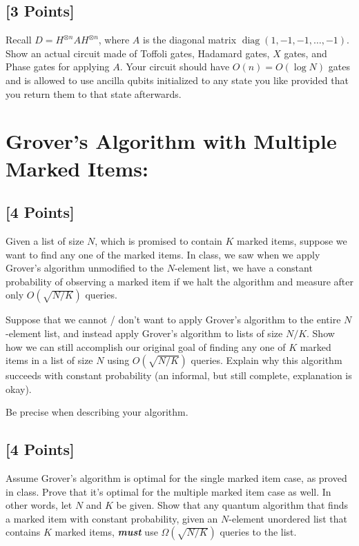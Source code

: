 \documentclass[11pt]{article}
\begin{document}
\subsection{[3 Points]} 
Recall $D = H^{\otimes n} A H^{\otimes n}$, where $A$ is the diagonal matrix $\operatorname{diag}\left(1,-1, -1,\dots,-1\right)$. 
Show an actual circuit made of Toffoli gates, Hadamard gates, $X$ gates, and Phase gates for applying $A$.  Your circuit should have $O(n)=O(\log N)$ gates and is allowed to use ancilla qubits initialized to any state you like provided that you return them to that state afterwards.



\section{Grover's Algorithm with Multiple Marked Items:}

\subsection{[4 Points]}  Given a list of size $N$, which is promised to contain $K$ marked items, suppose we want to find any one of the marked items. 
In class, we saw when we apply Grover's algorithm unmodified to the $N$-element list, we have a constant probability of observing a marked item if we halt the algorithm and measure after only $O({\sqrt{N/K}})$ queries.

Suppose that we cannot / don't want to apply Grover's algorithm to the entire $N$-element list, and instead apply Grover's algorithm to lists of size $N/K$. Show how we can still accomplish our original goal of finding any one of $K$ marked items in a list of size $N$ using $O(\sqrt{N/K})$ queries. Explain why this algorithm succeeds with constant probability (an informal, but still complete, explanation is okay).

Be precise when describing your algorithm.


\subsection{[4 Points]} Assume Grover's algorithm is optimal for the single marked item case, as proved in class.  Prove that it's optimal for the multiple marked item case as well.  In other words, let $N$ and $K$ be given.  Show that any quantum algorithm that finds a marked item with constant probability, given an $N$-element unordered list that contains $K$ marked items, \emph{\textbf{must}} use $\Omega({\sqrt{N/K}})$ queries to the list.  
\end{document}
